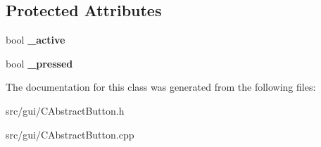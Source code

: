 \subsection*{Protected Attributes}
\begin{DoxyCompactItemize}
\item 
\hypertarget{class_c_abstract_button_a75207c5f3b0bbbacbcde194ec6db61e8}{
bool {\bfseries \_\-active}}
\label{class_c_abstract_button_a75207c5f3b0bbbacbcde194ec6db61e8}

\item 
\hypertarget{class_c_abstract_button_a6a91491e0a27b9a18b5c95af38c7b0f9}{
bool {\bfseries \_\-pressed}}
\label{class_c_abstract_button_a6a91491e0a27b9a18b5c95af38c7b0f9}

\end{DoxyCompactItemize}


The documentation for this class was generated from the following files:\begin{DoxyCompactItemize}
\item 
src/gui/CAbstractButton.h\item 
src/gui/CAbstractButton.cpp\end{DoxyCompactItemize}
